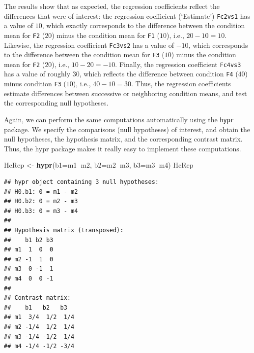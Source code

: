 \documentclass[12pt,]{krantz}
\newenvironment{Shaded}{\begin{snugshade}}{\end{snugshade}}
\newcommand{\KeywordTok}[1]{\textcolor[rgb]{0.13,0.29,0.53}{\textbf{#1}}}
\newcommand{\DataTypeTok}[1]{\textcolor[rgb]{0.13,0.29,0.53}{#1}}
\newcommand{\StringTok}[1]{\textcolor[rgb]{0.31,0.60,0.02}{#1}}
\newcommand{\OperatorTok}[1]{\textcolor[rgb]{0.81,0.36,0.00}{\textbf{#1}}}
\newcommand{\NormalTok}[1]{#1}
\theoremstyle{definition}
\theoremstyle{definition}
\theoremstyle{definition}
\theoremstyle{remark}
\begin{document}
The results show that as expected, the regression coefficients reflect
the differences that were of interest: the regression coefficient
(`Estimate') \texttt{Fc2vs1} has a value of \(10\), which exactly
corresponds to the difference between the condition mean for \texttt{F2}
(\(20\)) minus the condition mean for \texttt{F1} (\(10\)), i.e.,
\(20 - 10 = 10\). Likewise, the regression coefficient \texttt{Fc3vs2}
has a value of \(-10\), which corresponds to the difference between the
condition mean for \texttt{F3} (\(10\)) minus the condition mean for
\texttt{F2} (\(20\)), i.e., \(10 - 20 = -10\). Finally, the regression
coefficient \texttt{Fc4vs3} has a value of roughly \(30\), which
reflects the difference between condition \texttt{F4} (\(40\)) minus
condition \texttt{F3} (\(10\)), i.e., \(40 - 10 = 30\). Thus, the
regression coefficients estimate differences between successive or
neighboring condition means, and test the corresponding null hypotheses.

Again, we can perform the same computations automatically using the
\texttt{hypr} package. We specify the comparisons (null hypotheses) of
interest, and obtain the null hypotheses, the hypothesis matrix, and the
corresponding contrast matrix. Thus, the hypr package makes it really
easy to implement these computations.

\begin{Shaded}
\begin{Highlighting}[]
\NormalTok{HcRep <-}\StringTok{ }\KeywordTok{hypr}\NormalTok{(}\DataTypeTok{b1=}\NormalTok{m1}\OperatorTok{~}\NormalTok{m2, }\DataTypeTok{b2=}\NormalTok{m2}\OperatorTok{~}\NormalTok{m3, }\DataTypeTok{b3=}\NormalTok{m3}\OperatorTok{~}\NormalTok{m4)}
\NormalTok{HcRep}
\end{Highlighting}
\end{Shaded}

\begin{verbatim}
## hypr object containing 3 null hypotheses:
## H0.b1: 0 = m1 - m2
## H0.b2: 0 = m2 - m3
## H0.b3: 0 = m3 - m4
## 
## Hypothesis matrix (transposed):
##    b1 b2 b3
## m1  1  0  0
## m2 -1  1  0
## m3  0 -1  1
## m4  0  0 -1
## 
## Contrast matrix:
##    b1   b2   b3  
## m1  3/4  1/2  1/4
## m2 -1/4  1/2  1/4
## m3 -1/4 -1/2  1/4
## m4 -1/4 -1/2 -3/4
\end{verbatim}
\end{document}
